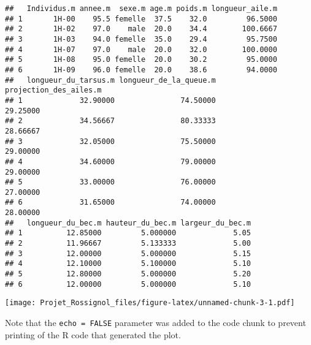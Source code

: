 \documentclass[
]{article}
\begin{document}
\begin{verbatim}
##   Individus.m annee.m  sexe.m age.m poids.m longueur_aile.m
## 1       1H-00    95.5 femelle  37.5    32.0         96.5000
## 2       1H-02    97.0    male  20.0    34.4        100.6667
## 3       1H-03    94.0 femelle  35.0    29.4         95.7500
## 4       1H-07    97.0    male  20.0    32.0        100.0000
## 5       1H-08    95.0 femelle  20.0    30.2         95.0000
## 6       1H-09    96.0 femelle  20.0    38.6         94.0000
##   longueur_du_tarsus.m longueur_de_la_queue.m projection_des_ailes.m
## 1             32.90000               74.50000               29.25000
## 2             34.56667               80.33333               28.66667
## 3             32.05000               75.50000               29.00000
## 4             34.60000               79.00000               29.00000
## 5             33.00000               76.00000               27.00000
## 6             31.65000               74.00000               28.00000
##   longueur_du_bec.m hauteur_du_bec.m largeur_du_bec.m
## 1          12.85000         5.000000             5.05
## 2          11.96667         5.133333             5.00
## 3          12.00000         5.000000             5.15
## 4          12.10000         5.100000             5.10
## 5          12.80000         5.000000             5.20
## 6          12.00000         5.000000             5.10
\end{verbatim}

\texttt{[image: Projet\_Rossignol\_files/figure-latex/unnamed-chunk-3-1.pdf]}

Note that the \texttt{echo\ =\ FALSE} parameter was added to the code
chunk to prevent printing of the R code that generated the plot.
\end{document}
